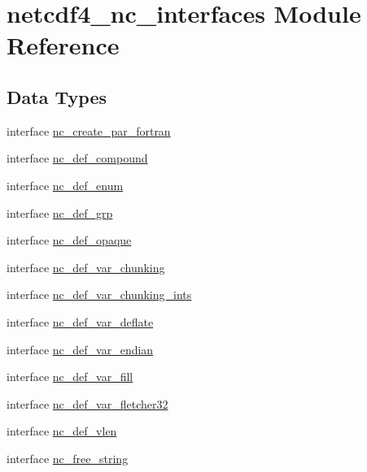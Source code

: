\hypertarget{namespacenetcdf4__nc__interfaces}{}\section{netcdf4\+\_\+nc\+\_\+interfaces Module Reference}
\label{namespacenetcdf4__nc__interfaces}
\subsection*{Data Types}
\begin{DoxyCompactItemize}
\item 
interface \hyperlink{interfacenetcdf4__nc__interfaces_1_1nc__create__par__fortran}{nc\+\_\+create\+\_\+par\+\_\+fortran}
\item 
interface \hyperlink{interfacenetcdf4__nc__interfaces_1_1nc__def__compound}{nc\+\_\+def\+\_\+compound}
\item 
interface \hyperlink{interfacenetcdf4__nc__interfaces_1_1nc__def__enum}{nc\+\_\+def\+\_\+enum}
\item 
interface \hyperlink{interfacenetcdf4__nc__interfaces_1_1nc__def__grp}{nc\+\_\+def\+\_\+grp}
\item 
interface \hyperlink{interfacenetcdf4__nc__interfaces_1_1nc__def__opaque}{nc\+\_\+def\+\_\+opaque}
\item 
interface \hyperlink{interfacenetcdf4__nc__interfaces_1_1nc__def__var__chunking}{nc\+\_\+def\+\_\+var\+\_\+chunking}
\item 
interface \hyperlink{interfacenetcdf4__nc__interfaces_1_1nc__def__var__chunking__ints}{nc\+\_\+def\+\_\+var\+\_\+chunking\+\_\+ints}
\item 
interface \hyperlink{interfacenetcdf4__nc__interfaces_1_1nc__def__var__deflate}{nc\+\_\+def\+\_\+var\+\_\+deflate}
\item 
interface \hyperlink{interfacenetcdf4__nc__interfaces_1_1nc__def__var__endian}{nc\+\_\+def\+\_\+var\+\_\+endian}
\item 
interface \hyperlink{interfacenetcdf4__nc__interfaces_1_1nc__def__var__fill}{nc\+\_\+def\+\_\+var\+\_\+fill}
\item 
interface \hyperlink{interfacenetcdf4__nc__interfaces_1_1nc__def__var__fletcher32}{nc\+\_\+def\+\_\+var\+\_\+fletcher32}
\item 
interface \hyperlink{interfacenetcdf4__nc__interfaces_1_1nc__def__vlen}{nc\+\_\+def\+\_\+vlen}
\item 
interface \hyperlink{interfacenetcdf4__nc__interfaces_1_1nc__free__string}{nc\+\_\+free\+\_\+string}

\end{DoxyCompactItemize}
